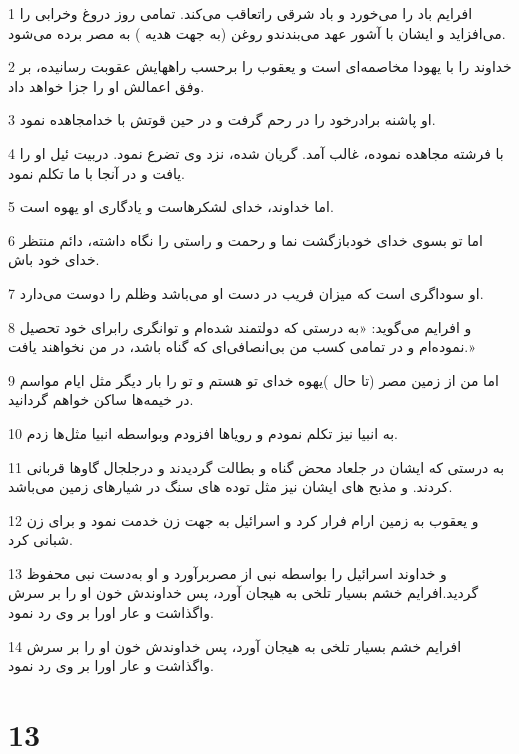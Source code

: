 \par 1 افرایم باد را می‌خورد و باد شرقی راتعاقب می‌کند. تمامی روز دروغ وخرابی را می‌افزاید و ایشان با آشور عهد می‌بندندو روغن (به جهت هدیه ) به مصر برده می‌شود.
\par 2 خداوند را با یهودا مخاصمه‌ای است و یعقوب را برحسب راههایش عقوبت رسانیده، بر وفق اعمالش او را جزا خواهد داد.
\par 3 او پاشنه برادرخود را در رحم گرفت و در حین قوتش با خدامجاهده نمود.
\par 4 با فرشته مجاهده نموده، غالب آمد. گریان شده، نزد وی تضرع نمود. دربیت ئیل او را یافت و در آنجا با ما تکلم نمود.
\par 5 اما خداوند، خدای لشکرهاست و یادگاری او یهوه است.
\par 6 اما تو بسوی خدای خودبازگشت نما و رحمت و راستی را نگاه داشته، دائم منتظر خدای خود باش.
\par 7 او سوداگری است که میزان فریب در دست او می‌باشد وظلم را دوست می‌دارد.
\par 8 و افرایم می‌گوید: «به درستی که دولتمند شده‌ام و توانگری رابرای خود تحصیل نموده‌ام و در تمامی کسب من بی‌انصافی‌ای که گناه باشد، در من نخواهند یافت.»
\par 9 اما من از زمین مصر (تا حال )یهوه خدای تو هستم و تو را بار دیگر مثل ایام مواسم در خیمه‌ها ساکن خواهم گردانید.
\par 10 به انبیا نیز تکلم نمودم و رویاها افزودم وبواسطه انبیا مثل‌ها زدم.
\par 11 به درستی که ایشان در جلعاد محض گناه و بطالت گردیدند و درجلجال گاوها قربانی کردند. و مذبح های ایشان نیز مثل توده های سنگ در شیارهای زمین می‌باشد.
\par 12 و یعقوب به زمین ارام فرار کرد و اسرائیل به جهت زن خدمت نمود و برای زن شبانی کرد.
\par 13 و خداوند اسرائیل را بواسطه نبی از مصربرآورد و او به‌دست نبی محفوظ گردید.افرایم خشم بسیار تلخی به هیجان آورد، پس خداوندش خون او را بر سرش واگذاشت و عار اورا بر وی رد نمود.
\par 14 افرایم خشم بسیار تلخی به هیجان آورد، پس خداوندش خون او را بر سرش واگذاشت و عار اورا بر وی رد نمود.

\chapter{13}

